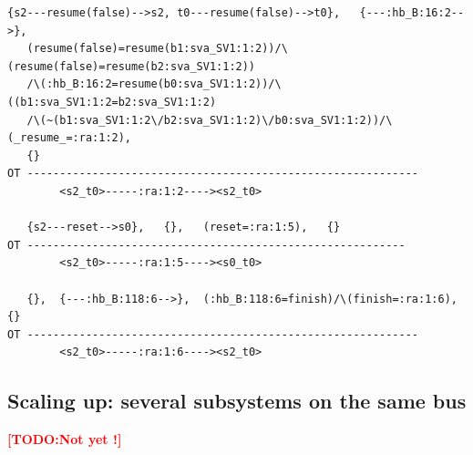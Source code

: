 \documentclass{lncs/llncs}
\newcommand{\TODO}[1]{\textcolor{red}{\textbf{[TODO:#1]}}}
\begin{document}
\begin{lstlisting}[basicstyle=\scriptsize\ttfamily, frame=single]
   {s2---resume(false)-->s2, t0---resume(false)-->t0},   {---:hb_B:16:2-->},
   (resume(false)=resume(b1:sva_SV1:1:2))/\(resume(false)=resume(b2:sva_SV1:1:2))
   /\(:hb_B:16:2=resume(b0:sva_SV1:1:2))/\((b1:sva_SV1:1:2=b2:sva_SV1:1:2)
   /\(~(b1:sva_SV1:1:2\/b2:sva_SV1:1:2)\/b0:sva_SV1:1:2))/\(_resume_=:ra:1:2),
   {}
OT ------------------------------------------------------------
        <s2_t0>-----:ra:1:2----><s2_t0>

   {s2---reset-->s0},   {},   (reset=:ra:1:5),   {}
OT ----------------------------------------------------------
        <s2_t0>-----:ra:1:5----><s0_t0>

   {},  {---:hb_B:118:6-->},  (:hb_B:118:6=finish)/\(finish=:ra:1:6),  {}
OT ------------------------------------------------------------
        <s2_t0>-----:ra:1:6----><s2_t0>
\end{lstlisting}


\subsection{Scaling up: several subsystems on the same bus}

\TODO{Not yet !}
\end{document}
